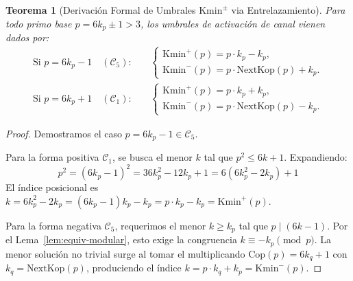 \documentclass{article}
\numberwithin{equation}{section}
\theoremstyle{plain}
\newtheorem{theorem}{Teorema}[section]
\theoremstyle{definition}
\begin{document}
\begin{theorem}[Derivación Formal de Umbrales $\mathrm{Kmin}^\pm$ via Entrelazamiento]
\label{thm:calculo-kmin-pm-completo}
Para todo primo base $p = 6k_p \pm 1 > 3$, los umbrales de activación de canal vienen dados por:
\begin{align}
\text{Si } p = 6k_p - 1 \quad (\mathcal{C}_5): &\quad 
\begin{cases}
\mathrm{Kmin}^+(p) = p \cdot k_p - k_p, \\
\mathrm{Kmin}^-(p) = p \cdot \mathrm{NextKop}(p) + k_p.
\end{cases} \\
\text{Si } p = 6k_p + 1 \quad (\mathcal{C}_1): &\quad 
\begin{cases}
\mathrm{Kmin}^+(p) = p \cdot k_p + k_p, \\
\mathrm{Kmin}^-(p) = p \cdot \mathrm{NextKop}(p) - k_p.
\end{cases}
\end{align}
\end{theorem}

\begin{proof}
Demostramos el caso $p = 6k_p - 1 \in \mathcal{C}_5$. 

Para la forma positiva $\mathcal{C}_1$, se busca el menor $k$ tal que $p^2 \le 6k + 1$. Expandiendo:
\begin{equation}
p^2 = (6k_p - 1)^2 = 36k_p^2 - 12k_p + 1 = 6(6k_p^2 - 2k_p) + 1
\end{equation}
El índice posicional es $k = 6k_p^2 - 2k_p = (6k_p - 1)k_p - k_p = p \cdot k_p - k_p = \mathrm{Kmin}^+(p)$.

Para la forma negativa $\mathcal{C}_5$, requerimos el menor $k \ge k_p$ tal que $p \mid (6k - 1)$. Por el Lema~\ref{lem:equiv-modular}, esto exige la congruencia $k \equiv -k_p \pmod p$. La menor solución no trivial surge al tomar el multiplicando $\mathrm{Cop}(p) = 6 k_q + 1$ con $k_q = \mathrm{NextKop}(p)$, produciendo el índice $k = p \cdot k_q + k_p = \mathrm{Kmin}^-(p)$.
\end{proof}
\end{document}
